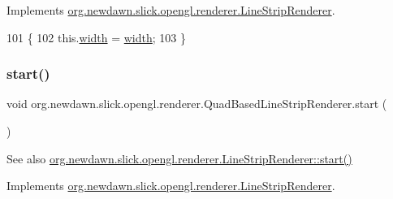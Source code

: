 Implements \mbox{\hyperlink{interfaceorg_1_1newdawn_1_1slick_1_1opengl_1_1renderer_1_1_line_strip_renderer_afc8159c0766c0d177b402cf311d9a7b8}{org.\+newdawn.\+slick.\+opengl.\+renderer.\+Line\+Strip\+Renderer}}.


\begin{DoxyCode}
101                                       \{
102         this.\mbox{\hyperlink{classorg_1_1newdawn_1_1slick_1_1opengl_1_1renderer_1_1_quad_based_line_strip_renderer_a2ea1970be2e402b69b69f7cefbf41c52}{width}} = \mbox{\hyperlink{classorg_1_1newdawn_1_1slick_1_1opengl_1_1renderer_1_1_quad_based_line_strip_renderer_a2ea1970be2e402b69b69f7cefbf41c52}{width}};
103     \}
\end{DoxyCode}
\mbox{\label{classorg_1_1newdawn_1_1slick_1_1opengl_1_1renderer_1_1_quad_based_line_strip_renderer_a63893acff7cb6395fe2c941477a78e76}} 
\subsubsection{\texorpdfstring{start()}{start()}}
{\footnotesize\ttfamily void org.\+newdawn.\+slick.\+opengl.\+renderer.\+Quad\+Based\+Line\+Strip\+Renderer.\+start (\begin{DoxyParamCaption}{ }\end{DoxyParamCaption})\hspace{0.3cm}{\ttfamily [inline]}}

\begin{DoxySeeAlso}{See also}
\mbox{\hyperlink{interfaceorg_1_1newdawn_1_1slick_1_1opengl_1_1renderer_1_1_line_strip_renderer_ac677ca9ed9c30f39a3eeb72b0532229a}{org.\+newdawn.\+slick.\+opengl.\+renderer.\+Line\+Strip\+Renderer\+::start()}} 
\end{DoxySeeAlso}


Implements \mbox{\hyperlink{interfaceorg_1_1newdawn_1_1slick_1_1opengl_1_1renderer_1_1_line_strip_renderer_ac677ca9ed9c30f39a3eeb72b0532229a}{org.\+newdawn.\+slick.\+opengl.\+renderer.\+Line\+Strip\+Renderer}}.


